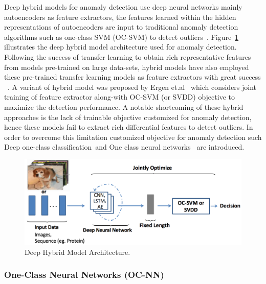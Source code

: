 Deep hybrid models for anomaly detection use deep neural networks mainly autoencoders as feature extractors, the features learned within the hidden representations of autoencoders are input to traditional anomaly detection algorithms such as one-class SVM (OC-SVM) to detect outliers~\cite{andrews2016detecting}. Figure~\ref{fig:HybridDeepModels} illustrates  the deep hybrid model architecture used for anomaly detection. Following the success of transfer learning to obtain rich representative features  from models pre-trained on large data-sets,  hybrid models have also employed these pre-trained transfer learning models as feature extractors with great success ~\cite{pan2010survey}. A variant of hybrid model was proposed by  Ergen et.al~\cite{ergen2017unsupervised} which considers joint training of feature extractor along-with OC-SVM (or SVDD) objective to maximize the detection performance. A notable shortcoming of these hybrid approaches
is the lack of trainable objective customized for anomaly detection, hence these models fail to extract rich differential features to detect outliers.  In order to overcome this limitation customized objective for anomaly detection such Deep one-class classification~\cite{ruff2018deep}and  One class neural networks~\cite{chalapathy2018anomaly} are introduced.

\begin{figure}
\centering
\includegraphics[scale=0.7]{images/HybridDeepModels}
\captionsetup{justification=centering}
\caption{Deep Hybrid Model Architecture.}
\label{fig:HybridDeepModels}
\end{figure}


\subsubsection{One-Class Neural Networks (OC-NN)}
\label{sec:oc-nn}

